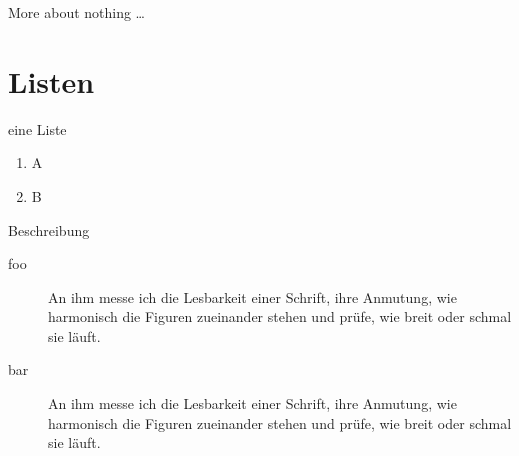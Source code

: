\documentclass[aspectratio=169, 12pt, mathserif]{beamer}
\begin{document}
    \begin{frame}
        \begin{block}{More about nothing \ldots}
            \blindtext[1]
        \end{block}
    \end{frame}

    \section{Listen}
    \begin{frame}
        \begin{block}{eine Liste}
            \begin{enumerate}
                \item A
                \item B
            \end{enumerate}
        \end{block}

        \begin{block}{Beschreibung}
            \begin{description}
                \item[foo] An ihm messe ich die Lesbarkeit einer Schrift,
ihre Anmutung, wie harmonisch die Figuren zueinander stehen
und prüfe, wie breit oder schmal sie läuft.
                \item[bar] An ihm messe ich die Lesbarkeit einer Schrift,
ihre Anmutung, wie harmonisch die Figuren zueinander stehen
und prüfe, wie breit oder schmal sie läuft.
            \end{description}        
        \end{block}
    \end{frame}
\end{document}
